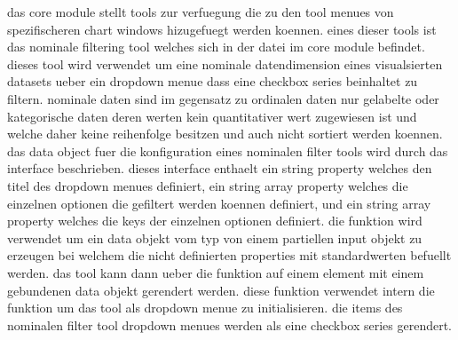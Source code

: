 das core module stellt tools zur verfuegung die zu den tool menues von spezifischeren chart windows hizugefuegt werden koennen.
eines dieser tools ist das nominale filtering tool welches sich in der  datei im core module befindet.
dieses tool wird verwendet um eine nominale datendimension eines visualsierten datasets ueber ein dropdown menue dass eine checkbox series beinhaltet zu filtern.
nominale daten sind im gegensatz zu ordinalen daten nur gelabelte oder kategorische daten deren werten kein quantitativer wert zugewiesen ist und welche daher keine reihenfolge besitzen und auch nicht sortiert werden koennen.
das data object fuer die konfiguration eines nominalen filter tools wird durch das  interface beschrieben.
dieses interface enthaelt ein  string property welches den titel des dropdown menues definiert, ein  string array property welches die einzelnen optionen die gefiltert werden koennen definiert, und ein  string array property welches die keys der einzelnen optionen definiert. 
die  funktion wird verwendet um ein data objekt vom typ  von einem partiellen input objekt zu erzeugen bei welchem die nicht definierten properties mit standardwerten befuellt werden.
das tool kann dann ueber die  funktion auf einem element mit einem gebundenen  data objekt gerendert werden.
diese funktion verwendet intern die  funktion um das tool als dropdown menue zu initialisieren.
die items des nominalen filter tool dropdown menues werden als eine checkbox series gerendert.

